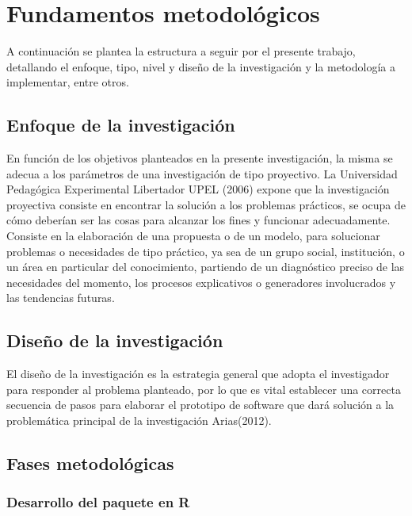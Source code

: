 \chapter{Fundamentos metodol\'ogicos}

	A continuaci\'on se plantea la estructura a seguir por el presente trabajo, detallando el enfoque, tipo, nivel y dise\~no de la investigaci\'on y la metodolog\'ia a implementar, entre otros.
	
\section{Enfoque de la investigaci\'on}
	
	En función de los objetivos planteados en la presente investigación, la misma se adecua a los parámetros de una investigación de tipo proyectivo. La Universidad Pedagógica Experimental Libertador UPEL (2006) expone que la investigación proyectiva consiste en encontrar la solución a los problemas prácticos, se ocupa de cómo deberían ser las cosas para alcanzar los fines y funcionar adecuadamente. Consiste en la elaboración de una propuesta o de un modelo, para solucionar problemas o necesidades de tipo práctico, ya sea de un grupo social, institución, o un área en particular del conocimiento, partiendo de un diagnóstico preciso de las necesidades del momento, los procesos explicativos o generadores involucrados y las tendencias futuras.\\
	
	
\section{Dise\~no de la investigaci\'on}
	
El diseño de la investigación es la estrategia general que adopta el investigador para responder al problema planteado,  por lo que es vital establecer una correcta secuencia de pasos para elaborar el prototipo de software que dar\'a solución a la problem\'atica principal de la investigación Arias(2012).\\

\section{Fases metodológicas}

\subsection{Desarrollo del paquete en R}


